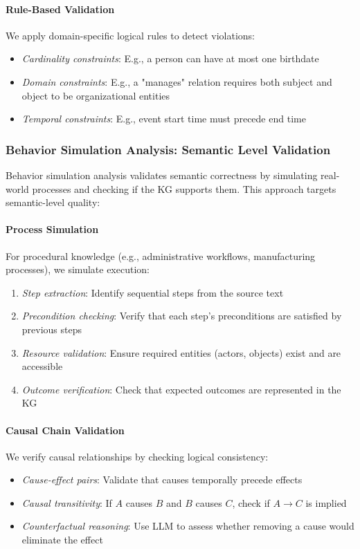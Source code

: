 \documentclass[runningheads]{llncs}
\begin{document}
\paragraph{Rule-Based Validation}
We apply domain-specific logical rules to detect violations:
\begin{itemize}
    \item \textit{Cardinality constraints}: E.g., a person can have at most one birthdate
    \item \textit{Domain constraints}: E.g., a "manages" relation requires both subject and object to be organizational entities
    \item \textit{Temporal constraints}: E.g., event start time must precede end time
\end{itemize}

\subsubsection{Behavior Simulation Analysis: Semantic Level Validation}

Behavior simulation analysis validates semantic correctness by simulating real-world processes and checking if the KG supports them. This approach targets semantic-level quality:

\paragraph{Process Simulation}
For procedural knowledge (e.g., administrative workflows, manufacturing processes), we simulate execution:
\begin{enumerate}
    \item \textit{Step extraction}: Identify sequential steps from the source text
    \item \textit{Precondition checking}: Verify that each step's preconditions are satisfied by previous steps
    \item \textit{Resource validation}: Ensure required entities (actors, objects) exist and are accessible
    \item \textit{Outcome verification}: Check that expected outcomes are represented in the KG
\end{enumerate}

\paragraph{Causal Chain Validation}
We verify causal relationships by checking logical consistency:
\begin{itemize}
    \item \textit{Cause-effect pairs}: Validate that causes temporally precede effects
    \item \textit{Causal transitivity}: If $A$ causes $B$ and $B$ causes $C$, check if $A \rightarrow C$ is implied
    \item \textit{Counterfactual reasoning}: Use LLM to assess whether removing a cause would eliminate the effect
\end{itemize}
\end{document}
